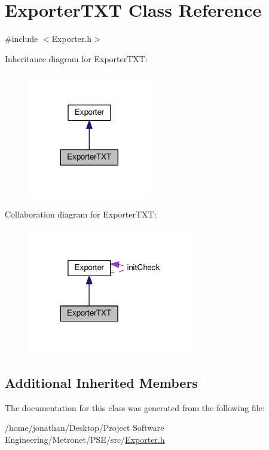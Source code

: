 \hypertarget{class_exporter_t_x_t}{}\section{Exporter\+T\+XT Class Reference}
\label{class_exporter_t_x_t}


{\ttfamily \#include $<$Exporter.\+h$>$}



Inheritance diagram for Exporter\+T\+XT\+:\nopagebreak
\begin{figure}[H]
\begin{center}
\leavevmode
\includegraphics[width=152pt]{class_exporter_t_x_t__inherit__graph}
\end{center}
\end{figure}


Collaboration diagram for Exporter\+T\+XT\+:\nopagebreak
\begin{figure}[H]
\begin{center}
\leavevmode
\includegraphics[width=206pt]{class_exporter_t_x_t__coll__graph}
\end{center}
\end{figure}
\subsection*{Additional Inherited Members}


The documentation for this class was generated from the following file\+:\begin{DoxyCompactItemize}
\item 
/home/jonathan/\+Desktop/\+Project Software Engineering/\+Metronet/\+P\+S\+E/src/\hyperlink{_exporter_8h}{Exporter.\+h}\end{DoxyCompactItemize}
